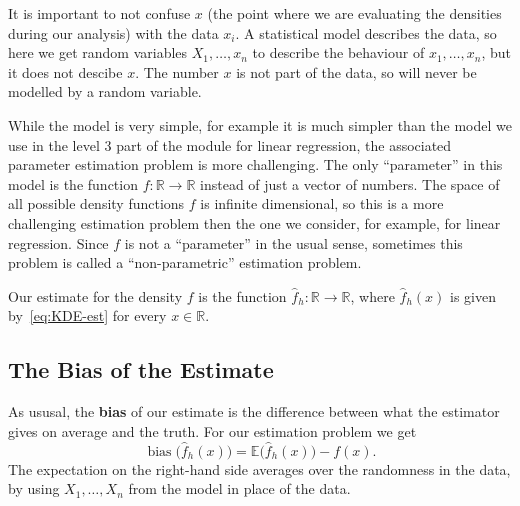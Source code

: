 \documentclass[
  a4paper,
]{article}
\theoremstyle{definition}
\theoremstyle{definition}
\theoremstyle{definition}
\theoremstyle{definition}
\theoremstyle{remark}
\begin{document}
It is important to not confuse \(x\) (the point where we are evaluating
the densities during our analysis) with the data \(x_i\). A statistical
model describes the data, so here we get random variables \(X_1, \ldots, x_n\)
to describe the behaviour of \(x_1, \ldots, x_n\), but it does not descibe \(x\).
The number \(x\) is not part of the data, so will never be modelled by a
random variable.

While the model is very simple, for example it is much simpler than the
model we use in the level 3 part of the module for linear regression,
the associated parameter estimation problem is more challenging.
The only ``parameter'' in this model is the function \(f \colon\mathbb{R}\to \mathbb{R}\)
instead of just a vector of numbers. The space of all possible density
functions \(f\) is infinite dimensional, so this is a more challenging
estimation problem then the one we consider, for example, for linear
regression. Since \(f\) is not a ``parameter'' in the usual sense, sometimes
this problem is called a ``non-parametric'' estimation problem.

Our estimate for the density \(f\) is the function \(\hat f_h\colon \mathbb{R}\to \mathbb{R}\),
where \(\hat f_h(x)\) is given by~\eqref{eq:KDE-est} for every \(x \in\mathbb{R}\).

\hypertarget{the-bias-of-the-estimate}{%
\subsection{The Bias of the Estimate}\label{the-bias-of-the-estimate}}

As ususal, the \textbf{bias} of our estimate is the difference between
what the estimator gives on average and the truth. For our estimation
problem we get
\begin{equation*}
    \mathop{\mathrm{bias}}\bigl(\hat f_h(x)\bigr)
    = \mathbb{E}\bigl(\hat f_h(x)\bigr) - f(x).
\end{equation*}
The expectation on the right-hand side averages over the randomness
in the data, by using \(X_1, \ldots, X_n\) from the model in place of
the data.
\end{document}
